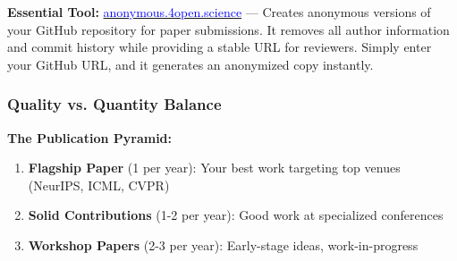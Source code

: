 \documentclass[11pt,a4paper]{article}
\begin{document}
\begin{tcolorbox}[colback=green!5,colframe=green!50,title={Code Anonymization for Double-Blind Review}]
\textbf{Essential Tool:} \href{https://anonymous.4open.science/}{\textcolor{blue}{anonymous.4open.science}} — Creates anonymous versions of your GitHub repository for paper submissions. It removes all author information and commit history while providing a stable URL for reviewers. Simply enter your GitHub URL, and it generates an anonymized copy instantly.
\end{tcolorbox}

\subsubsection{Quality vs. Quantity Balance}

\textbf{The Publication Pyramid:}
\begin{enumerate}
    \item \textbf{Flagship Paper} (1 per year): Your best work targeting top venues (NeurIPS, ICML, CVPR)
    \item \textbf{Solid Contributions} (1-2 per year): Good work at specialized conferences
    \item \textbf{Workshop Papers} (2-3 per year): Early-stage ideas, work-in-progress
\end{enumerate}
\end{document}
